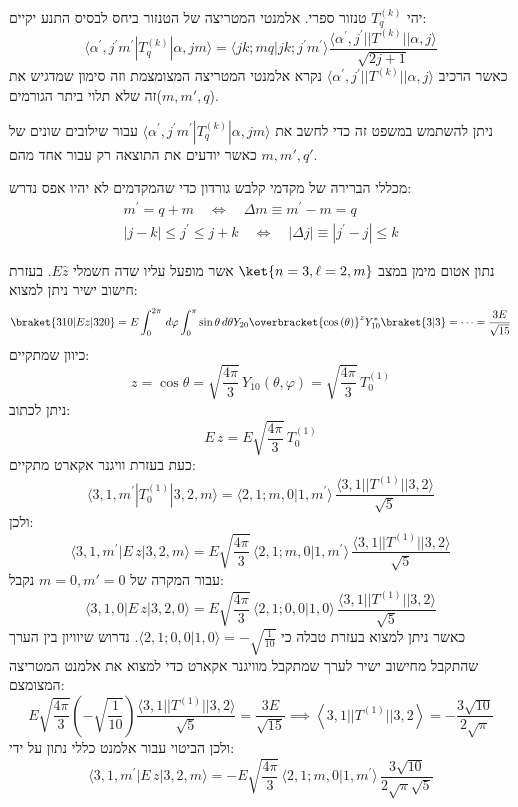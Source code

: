 \documentclass{tstextbook}
\begin{document}
\begin{theorem}
יהי \(T_{q}^{(k)}\) טנזור ספרי. אלמנטי המטריצה של הטנזור ביחס לבסיס התנע יקיים:
$$\langle\alpha^{\prime},j^{\prime}m^{\prime}|T_{q}^{(k)}|\alpha,j m\rangle=\langle j k;m q|j k;j^{\prime}m^{\prime}\rangle\frac{\langle\alpha^{\prime},j^{\prime}||T^{(k)}||\alpha,j\rangle}{\sqrt{2j+1}}$$
כאשר הרכיב \(\langle\alpha^{\prime},j^{\prime}||T^{(k)}||\alpha,j\rangle\) נקרא אלמנטי המטריצה המצומצמת וזה סימון שמדגיש את זה שלא תלוי ביתר הגורמים(\(m,m',q\)).

\end{theorem}
\begin{remark}
ניתן להשתמש במשפט זה כדי לחשב את \(\langle\alpha^{\prime},j^{\prime}m^{\prime}|T_{q}^{(k)}|\alpha,j m\rangle\) עבור שילובים שונים של \(m,m',q'\) כאשר יודעים את התוצאה רק עבור אחד מהם.

\end{remark}
\begin{corollary}
מכללי הברירה של מקדמי קלבש גורדון כדי שהמקדמים לא יהיו אפס נדרש:
$$\begin{gather}m^{\prime}=q+m\quad\iff\quad\Delta m\equiv m^{\prime}-m=q\\ |j-k|\leq j^{\prime}\leq j+k\quad\iff\quad|\Delta j|\equiv|j^{\prime}-j|\leq k 
\end{gather}$$

\end{corollary}
\begin{example}
נתון אטום מימן במצב \(\ket{n=3,\ell=2,m}\) אשר מופעל עליו שדה חשמלי \(E\hat{z}\). בעזרת חישוב ישיר ניתן למצוא:
$$\braket{ 310 | Ez|320 } =E\int_{0}^{2\pi}  \, d\varphi \int_{0}^{\pi} \sin \theta \, d\theta Y_{20}  \overbracket{ \cos\left( \theta \right) }^{ z }Y_{10}^{*}\braket{ 3 | 3 } =\dots=\frac{3E}{\sqrt{ 15 }}$$
כיוון שמתקיים:
$$z=\cos\theta=\sqrt{\frac{4\pi}{3}}\,Y_{10}(\theta,\varphi)=\sqrt{\frac{4\pi}{3}}\,T_{0}^{(1)}$$
ניתן לכתוב:
$$E\,z=E\sqrt{\frac{4\pi}{3}}\,T_{0}^{(1)}$$
כעת בעזרת וויגנר אקארט מתקיים:
$$\langle3,1,m^{\prime}|T_{0}^{(1)}|3,2,m\rangle=\langle2,1;m,0|1,m^{\prime}\rangle\,\frac{\langle3,1||T^{(1)}||3,2\rangle}{\sqrt{5}}$$
ולכן:
$$\langle3,1,m^{\prime}|E\,z|3,2,m\rangle=E\sqrt{\frac{4\pi}{3}}\,\langle2,1;m,0|1,m^{\prime}\rangle\,\frac{\langle3,1||T^{(1)}||3,2\rangle}{\sqrt{5}}$$
עבור המקרה של \(m=0,m'=0\) נקבל:
$$\langle3,1,0|E\,z|3,2,0\rangle=E\sqrt{\frac{4\pi}{3}}\,\langle2,1;0,0|1,0\rangle\,\frac{\langle3,1||T^{(1)}||3,2\rangle}{\sqrt{5}}$$
כאשר ניתן למצוא בעזרת טבלה כי \(\langle2,1;0,0|1,0\rangle=-\sqrt{\frac{1}{10}}\).  נדרוש שיוויון בין הערך שהתקבל מחישוב ישיר לערך שמתקבל מוויגנר אקארט כדי למצוא את אלמנט המטריצה המצומצם:
$$E{\sqrt{\frac{4\pi}{3}}}\left(-{\sqrt{\frac{1}{10}}}\right){\frac{\langle3,1||T^{(1)}||3,2\rangle}{\sqrt{5}}}={\frac{3E}{\sqrt{15}}}\implies\left\langle {3},{1}||T^{(1)}||{3},{2} \right\rangle=-\frac{{3}\sqrt{10}}{2\sqrt{\pi}}$$
ולכן הביטוי עבור אלמנט כללי נתון על ידי:
$$\langle3,1,m^{\prime}|E\,z|3,2,m\rangle=-E\sqrt{\frac{4\pi}{3}}\,\langle2,1;m,0|1,m^{\prime}\rangle\,\frac{3\sqrt{10}}{2\sqrt{\pi}\sqrt{5}}$$

\end{example}
\end{document}
